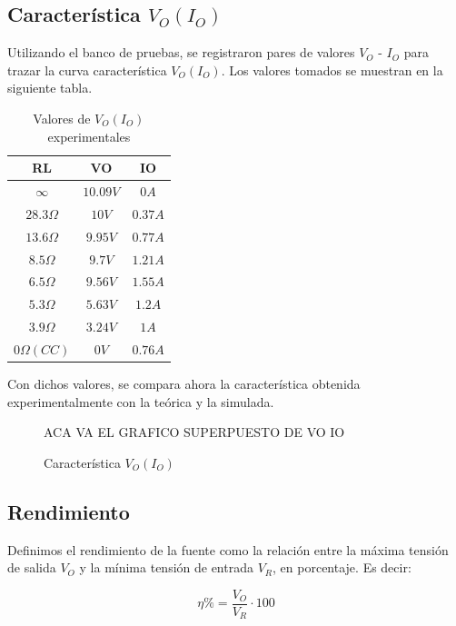 \subsection{Caracter\'istica $V_O(I_O)$}

Utilizando el banco de pruebas, se registraron pares de valores $V_O$ - $I_O$ para trazar la curva caracter\'istica $V_O(I_O)$. Los valores tomados se muestran en la siguiente tabla.

\begin{table}[!h]
\begin{centering}

\begin{tabular}[H]{|c|c|c|}
\hline 
RL & VO & IO\tabularnewline
\hline 
\hline 
$\infty$ & $10.09V$ & $0A$\tabularnewline
\hline 
$28.3 \Omega$ & $10V$ & $0.37A$\tabularnewline
\hline 
$13.6 \Omega$ & $9.95V$ & $0.77A$\tabularnewline
\hline 
$8.5 \Omega$ & $9.7V$ & $1.21A$\tabularnewline
\hline 
$6.5 \Omega$ & $9.56V$ & $1.55A$\tabularnewline
\hline 
$5.3 \Omega$ & $5.63V$ & $1.2A$\tabularnewline
\hline 
$3.9 \Omega$ & $3.24V$ & $1A$\tabularnewline
\hline 
$0 \Omega (CC)$ & $0V$ & $0.76A$\tabularnewline
\hline 
\end{tabular}
\par\end{centering}
\caption{Valores de $V_O(I_O)$ experimentales}

\end{table}

Con dichos valores, se compara ahora la caracter\'istica obtenida experimentalmente con la te\'orica y la simulada.

\begin{figure}[!h]
\begin{centering}
ACA VA EL GRAFICO SUPERPUESTO DE VO IO
\par\end{centering}
\caption{Caracter\'istica $V_O(I_O)$}

\end{figure}  

\subsection{Rendimiento}

Definimos el rendimiento de la fuente como la relaci\'on entre la m\'axima tensi\'on de salida $V_O$ y la m\'inima tensi\'on de entrada $V_R$, en porcentaje. Es decir:

$$\eta \% = \frac{V_O}{V_R} \cdot 100$$ 

